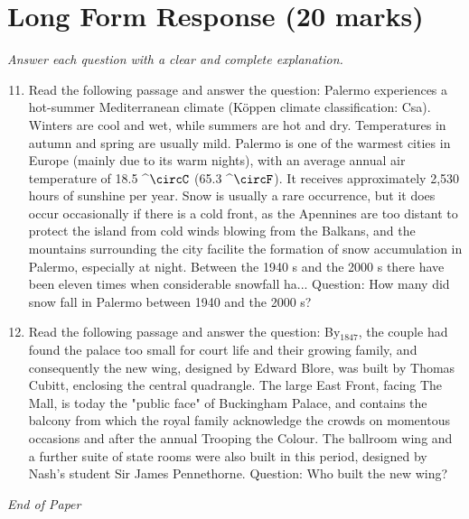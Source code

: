 \documentclass[12pt]{article}
\begin{document}
\section*{Long Form Response (20 marks)}
\textit{Answer each question with a clear and complete explanation.}
\begin{enumerate}[label=\arabic*.]
\setcounter{enumi}{10}
\item Read the following passage and answer the question: Palermo experiences a hot-summer Mediterranean climate (Köppen climate classification: Csa). Winters are cool and wet, while summers are hot and dry. Temperatures in autumn and spring are usually mild. Palermo is one of the warmest cities in Europe (mainly due to its warm nights), with an average annual air temperature of 18.5 ^\ensuremath{\circC} (65.3 ^\ensuremath{\circF}). It receives approximately 2,530 hours of sunshine per year. Snow is usually a rare occurrence, but it does occur occasionally if there is a cold front, as the Apennines are too distant to protect the island from cold winds blowing from the Balkans, and the mountains surrounding the city facilite the formation of snow accumulation in Palermo, especially at night. Between the 1940 s and the 2000 s there have been eleven times when considerable snowfall ha... Question: How many did snow fall in Palermo between 1940 and the 2000 s?
\item Read the following passage and answer the question: By$_{1847}$, the couple had found the palace too small for court life and their growing family, and consequently the new wing, designed by Edward Blore, was built by Thomas Cubitt, enclosing the central quadrangle. The large East Front, facing The Mall, is today the "public face" of Buckingham Palace, and contains the balcony from which the royal family acknowledge the crowds on momentous occasions and after the annual Trooping the Colour. The ballroom wing and a further suite of state rooms were also built in this period, designed by Nash's student Sir James Pennethorne. Question: Who built the new wing?
\end{enumerate}

\vfill
\noindent\textit{End of Paper}
\end{document}
